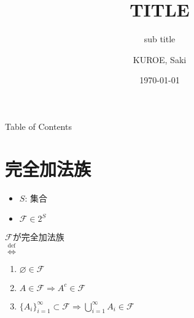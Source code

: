 \documentclass[aspectratio=169, dvipdfmx, 11pt]{beamer}
\title[]{TITLE}
\subtitle[]{sub title}
\author[]{KUROE, Saki}
\institute[]{Hogehoge University}
\date{\today}
\begin{document}
\begin{frame}{}
    \titlepage
\end{frame}

\begin{frame}{Table of Contents}
    \tableofcontents
\end{frame}

\section{完全加法族}
\begin{frame}{}
    \begin{tcolorbox}[
            colframe = red,
            colback = red!5!white,
            colbacktitle = red,
            coltitle = white,
            fonttitle = \bfseries,
            rightrule = 0pt,
            leftrule = 0pt,
            bottomrule = 0pt,
            arc = 0pt,
            title = Def 1.1. 完全加法族
        ]
        {
            \begin{tcolorbox}
                \begin{itemize}
                    \item $S$: 集合
                    \item $\mathcal{F} \in 2^{S}$
                \end{itemize}
            \end{tcolorbox}
            $\mathcal{F}$が完全加法族 \\
            $\overset{\text{def}}{\Longleftrightarrow}$
            \begin{enumerate}
                \item $\varnothing \in \mathcal{F}$
                \item $A \in \mathcal{F} \Rightarrow A^{c} \in \mathcal{F}$
                \item $\{A_{i}\}_{i = 1}^{\infty} \subset \mathcal{F} \Rightarrow \bigcup_{i = 1}^{\infty} A_{i} \in \mathcal{F}$
            \end{enumerate}
        }
    \end{tcolorbox}
\end{frame}
\end{document}
